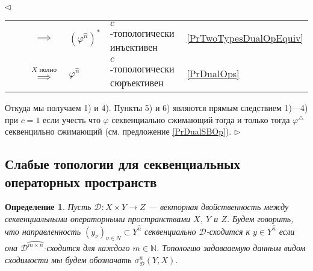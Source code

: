 \documentclass[12pt]{article}
\newtheorem{definition}[theorem]{Определение}
\newenvironment{proof}{\par $\triangleleft$}{$\triangleright$}
\begin{document}
\begin{proof}
\begin{tabular}{llclll}
                        &                               & $\implies$ & $(\varphi^{\wideparen{n}})^*$         & $c$-топологически инъективен &\ref{PrTwoTypesDualOpEquiv}\\
                        &                               & $\overset{\mbox{$X$ полно}}{\implies}$ & $\varphi^{\wideparen{n}}$             & $c$-топологически сюръективен     &\ref{PrDualOps}\\
\end{tabular}
\newline
Откуда мы получаем 1) и 4). Пункты 5) и 6) являются прямым следствием 1)---4) при $c=1$ если учесть что $\varphi$ секвенциально сжимающий тогда и только тогда $\varphi^\triangle$ секвенцильно сжимающий (см. предложение \ref{PrDualSBOp}).
\end{proof}























\subsection{Слабые топологии для секвенциальных операторных пространств}

\begin{definition}\label{DefSQDconv} Пусть $\mathcal{D}:X\times Y\to Z$ --- векторная двойственность между секвенциальными операторными пространствами $X$, $Y$ и $Z$. Будем говорить, что направленность $(y_\nu)_{\nu\in N}\subset Y^{\wideparen{n}}$ секвенциально $\mathcal{D}$-сходится к $y\in Y^{\wideparen{n}}$ если она $\mathcal{D}^{\wideparen{m\times n}}$-сходится для каждого $m\in\mathbb{N}$.  Топологию задавааемую данным видом сходимости мы будем обозначать $\sigma_{\mathcal{D}}^{\widehat{n}}(Y,X)$.
\end{definition}
\end{document}
